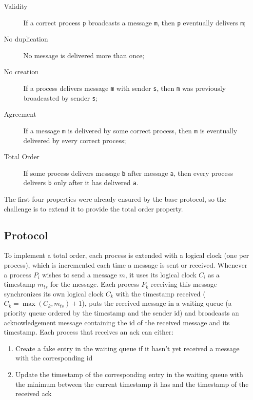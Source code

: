 \documentclass[a4paper, 11pt]{article}
\begin{document}
\begin{description}
	\item[Validity] If a correct process \texttt{p} broadcasts a message \texttt{m}, then \texttt{p} eventually delivers \texttt{m};
	\item[No duplication] No message is delivered more than once;
	\item[No creation] If a process delivers message \texttt{m} with sender \texttt{s}, then \texttt{m} was previously broadcasted by sender \texttt{s};
	\item[Agreement] If a message \texttt{m} is delivered by some correct process, then \texttt{m} is eventually delivered by every correct process;
	\item[Total Order] If some process delivers message \texttt{b} after message \texttt{a}, then every process delivers \texttt{b} only after it has delivered \texttt{a}.
\end{description}

	The first four properties were already ensured by the base protocol, so the challenge is to extend it to provide the total order property.

\subsection{Protocol}
	To implement a total order, each process is extended with a logical clock (one per process), which is incremented each time a message is sent or received. Whenever a process $P_i$ wishes to send a message $m$, it uses its logical clock $C_i$ as a timestamp $m_{ts}$ for the message. Each process $P_k$ receiving this message synchronizes its own logical clock $C_k$ with the timestamp received ($C_k = \max(C_k, m_{ts}) + 1$), puts the received message in a waiting queue (a priority queue ordered by the timestamp and the sender id) and broadcasts an acknowledgement message containing the id of the received message and its timestamp. Each process that receives an ack can either:

\begin{enumerate}
	\item Create a fake entry in the waiting queue if it hasn't yet received a message with the corresponding id
	\item Update the timestamp of the corresponding entry in the waiting queue with the minimum between the current timestamp it has and the timestamp of the received ack
\end{enumerate}
\end{document}
